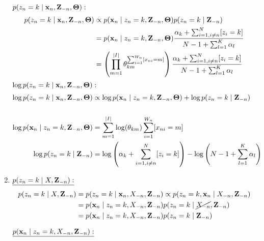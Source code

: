 \begin{enumerate}
   \underline{$p(z_n = k \mid \bold{x}_n, \mathbf{Z}_{-n}, \bold{\Theta}):$} 
    \begin{align*}
       p(z_n = k \mid \bold{x}_n, \mathbf{Z}_{-n}, \bold{\Theta}) &\propto p(\bold{x}_n \mid z_n = k, \mathbf{Z}_{-n}, \bold{\Theta})  p(z_n = k \mid \mathbf{Z}_{-n}) 
       \\
       &= p(\bold{x}_n \mid z_n = k, \mathbf{Z}_{-n}, \bold{\Theta}) \frac{\alpha_k + \sum_{i=1, i \neq n}^N[z_i = k]}{N - 1 + \sum_{l=1}^K \alpha_l} 
       \\
       &= \left(\prod_{m=1}^{\vert I \vert} \theta_{km}^{\sum_{i=1}^{W_n}[x_{ni} = m]}\right) \frac{\alpha_k + \sum_{i=1, i \neq n}^N[z_i = k]}{N - 1 + \sum_{l=1}^K \alpha_l} 
   \end{align*}
   \underline{$\operatorname{log} p(z_n = k \mid \bold{x}_n, \mathbf{Z}_{-n}, \bold{\Theta}):$} 
   \begin{align*}
         \operatorname{log}p(z_n = k \mid \bold{x}_n, \mathbf{Z}_{-n}, \bold{\Theta}) &\propto \operatorname{log}p(\bold{x}_n \mid z_n = k, \mathbf{Z}_{-n}, \bold{\Theta})  + \operatorname{log}p(z_n = k \mid \mathbf{Z}_{-n}) 
         \\\\
         \operatorname{log}p(\bold{x}_n \mid z_n = k, \mathbf{Z}_{-n}, \bold{\Theta}) &= \sum_{m=1}^{\vert I \vert} \operatorname{log}(\theta_{km})\sum_{i=1}^{W_n}[x_{ni} = m]
         \\
         \operatorname{log}p(z_n = k \mid \mathbf{Z}_{-n}) &= \operatorname{log}\left(\alpha_k + \sum_{i=1, i \neq n}^N[z_i = k]\right) - \operatorname{log}\left(N - 1 + \sum_{l=1}^K \alpha_l\right)
   \end{align*}
   \newpage
   \item 
   
    \textbf{$\underline{p(z_n = k \mid X, \mathbf{Z}_{-n}):}$}    
    \begin{align*}
        p(z_n = k \mid X, \mathbf{Z}_{-n}) &= p(z_n = k \mid \bold{x}_n, X_{-n}, \mathbf{Z}_{-n}) \propto  p(z_n = k, \bold{x}_n  \mid X_{-n}, \mathbf{Z}_{-n})
        \\
        &= p(\bold{x}_n \mid  z_n = k, X_{-n}, \mathbf{Z}_{-n})p(z_n = k \mid \cancel{X_{-n}}, \mathbf{Z}_{-n})
        \\ 
        &= p(\bold{x}_n \mid  z_n = k, X_{-n}, \mathbf{Z}_{-n})p(z_n = k \mid \mathbf{Z}_{-n})
    \end{align*}{}
    
    \textbf{$\underline{p(\bold{x}_n \mid  z_n = k, X_{-n}, \mathbf{Z}_{-n}):}$}
    

\end{enumerate}
